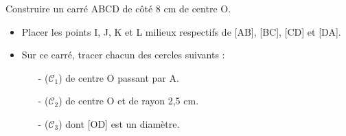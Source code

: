 \begin{exercice*}
   {\small Construire un carré} ABCD de côté 8 cm de centre O.
   \begin{itemize}
      \item Placer les points I, J, K et L milieux respectifs de [AB], [BC], [CD] et [DA].
      \item Sur ce carré, tracer chacun des cercles suivants :
      \begin{itemize}
         \item[-] ($\mathcal{C}_1$) de centre O passant par A.
         \item[-] ($\mathcal{C}_2$) de centre O et de rayon 2,5 cm.
         \item[-] ($\mathcal{C}_3$) dont [OD] est un diamètre.
      \end{itemize}
   \end{itemize}
 \end{exercice*} 
   
 